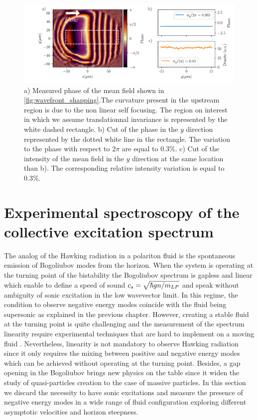 \begin{figure}[h]
    \centering
    \includegraphics[width=1\textwidth]{chap3_custom_st/fig/phase_example.pdf}
    \caption{a) Measured phase of the mean field shown in \autoref{fig:wavefront_shapping}.The curvature present in the upstream region is due to the non linear self focusing. The region
    on interest in which we assume translationnal invariance is represented by the white dashed rectangle. b)  Cut of the phase in the $y$ direction represented by the dotted white line in the rectangle. The variation to the phase with respect
    to $2\pi$ are equal to 0.3\%. c) Cut of the intensity of the mean field in the $y$ direction at the same location than b). The corresponding relative intensity variation is equal to 0.3\%.}
    \label{fig:phase_example}
\end{figure}

\section{Experimental spectroscopy of the collective excitation spectrum}

The analog of the Hawking radiation in a polariton fluid is the spontaneous emission of Bogoliubov modes from the horizon. When the system is operating at the turning point of the bistability the Bogoliubov spectrum 
is gapless and linear which enable to define a speed of sound $c_s = \sqrt{\hbar g n /m_{LP}}$ and speak without ambiguity of sonic excitation in the low wavevector limit. In this regime, the condition to observe negative energy modes coincide with the fluid being supersonic as explained in the previous chapter. 
However, creating a stable fluid at the turning point is quite challenging and the measurement of the spectrum linearity require experimental techniques that are hard to implement on a moving fluid \cite{claude_phd}. Nevertheless, linearity is not mandatory to observe Hawking radiation since 
it only requires the mixing between positive and negative energy modes which can be achieved without operating at the turning point. Besides, a gap opening in the Bogoliubov brings new physics on the table since it widen the study of quasi-particles creation to the case of massive particles. In this
section we discard the necessity to have sonic excitations and measure the presence of negative energy modes in a wide range of fluid configuration exploring different asymptotic velocities and horizon steepness.

